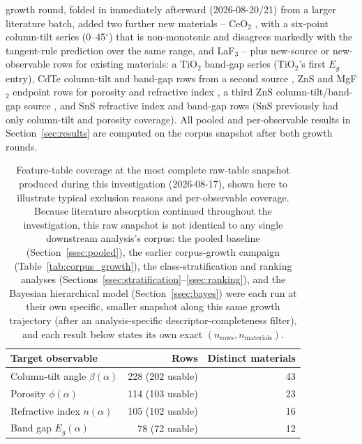 \documentclass[aip,amsmath,amssymb,reprint]{revtex4-1}
\begin{document}
growth round, folded in immediately afterward (2026-08-20/21) from a
larger literature batch, added two further new materials -- CeO$_2$
\citep{hodgkinson1996}, with a six-point column-tilt series
(0--45$^{\circ}$) that is non-monotonic and disagrees markedly with
the tangent-rule prediction over the same range, and LaF$_3$
\citep{liu2007} -- plus new-source or new-observable rows for
existing materials: a TiO$_2$ band-gap series \citep{pandey2022}
(TiO$_2$'s first $E_g$ entry), CdTe column-tilt and band-gap rows
from a second source \citep{ehsani2013}, ZnS and MgF$_2$ endpoint
rows for porosity and refractive index \citep{oh2020}, a third ZnS
column-tilt/band-gap source \citep{ashrafi2018}, and SnS refractive
index and band-gap rows \citep{sazideh2017,sazideh2018} (SnS
previously had only column-tilt and porosity coverage). All pooled
and per-observable results in Section~\ref{sec:results} are computed
on the corpus snapshot after both growth rounds.

\begin{table}[htbp]
  \centering
  \caption{Feature-table coverage at the most complete raw-table
    snapshot produced during this investigation (2026-08-17), shown
    here to illustrate typical exclusion reasons and per-observable
    coverage. Because literature absorption continued throughout the
    investigation, this raw snapshot is not identical to any single
    downstream analysis's corpus: the pooled baseline
    (Section~\ref{ssec:pooled}), the earlier corpus-growth campaign
    (Table~\ref{tab:corpus_growth}), the class-stratification and
    ranking analyses (Sections~\ref{ssec:stratification}--\ref{ssec:ranking}),
    and the Bayesian hierarchical model (Section~\ref{ssec:bayes}) were
    each run at their own specific, smaller snapshot along this same
    growth trajectory (after an analysis-specific descriptor-completeness
    filter), and each result below states its own exact
    $(n_{\mathrm{rows}}, n_{\mathrm{materials}})$.}
  \label{tab:coverage}
  \begin{tabular}{lrr}
    \toprule
    Target observable & Rows & Distinct materials \\
    \midrule
    Column-tilt angle $\beta(\alpha)$ & 228 (202 usable) & 43 \\
    Porosity $\phi(\alpha)$ & 114 (103 usable) & 23 \\
    Refractive index $n(\alpha)$ & 105 (102 usable) & 16 \\
    Band gap $E_g(\alpha)$ & 78 (72 usable) & 12 \\
    \bottomrule
  \end{tabular}
\end{table}
\end{document}
